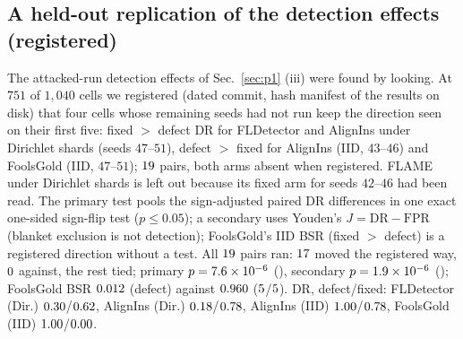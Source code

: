 \documentclass[journal]{IEEEtran}
\begin{document}
\subsection{A held-out replication of the detection effects (registered)}
\label{sup:p3x}
The attacked-run detection effects of Sec.~\ref{sec:p1} (iii) were found by looking.
At $751$ of $1{,}040$ cells we registered (dated commit, hash manifest of the results
on disk) that four cells whose remaining seeds had not
run keep the direction seen on their first five: fixed $>$ defect DR for FLDetector
and AlignIns under Dirichlet shards (seeds $47$--$51$), defect $>$ fixed for AlignIns
(IID, $43$--$46$) and FoolsGold (IID, $47$--$51$); $19$ pairs, both arms absent
when registered. FLAME under Dirichlet shards is left out because its fixed arm for
seeds $42$--$46$ had been read. The primary test pools the sign-adjusted paired DR
differences in one exact one-sided sign-flip test ($p\le0.05$); a secondary uses
Youden's $J=\mathrm{DR}-\mathrm{FPR}$ (blanket exclusion is not detection); FoolsGold's IID BSR (fixed $>$ defect) is a registered
direction without a test. All $19$ pairs ran: $17$ moved the registered
way, $0$ against, the rest tied; primary $p=7.6\times10^{-6}$ (\pxXOneSup), secondary
$p=1.9\times10^{-6}$ (\pxXTwoSup); FoolsGold BSR $0.012$ (defect) against $0.960$
($5$/$5$). DR, defect/fixed: FLDetector (Dir.)
$0.30$/$0.62$, AlignIns (Dir.) $0.18$/$0.78$, AlignIns (IID)
$1.00$/$0.78$, FoolsGold (IID) $1.00$/$0.00$.
\end{document}
